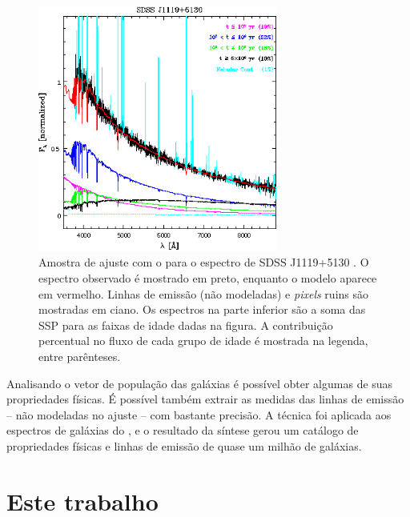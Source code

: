 \begin{figure}
	\includegraphics[width=0.7\textwidth]{figuras/starlight-fit.eps}
	\caption[Amostra de ajuste de espectro com o \starlight.]
	{Amostra de ajuste com o \starlight para o espectro de SDSS
	J1119+5130 \citep[figura 2]{CidFernandes2006}. O espectro observado é mostrado
	em preto, enquanto o modelo aparece em vermelho. Linhas de emissão (não
	modeladas) e {\em pixels} ruins são mostradas em ciano. Os espectros na parte
	inferior são a soma das SSP para as faixas de idade dadas na figura. A
	contribuição percentual no fluxo de cada grupo de idade é mostrada na legenda,
	entre parênteses.}
	\label{fig:StarlightSpectrumSample}
\end{figure}

Analisando o vetor de população das galáxias é possível obter algumas de suas
propriedades físicas. É possível também extrair as medidas das linhas de emissão
-- não modeladas no ajuste -- com bastante precisão. A técnica foi aplicada aos
espectros de galáxias do \SDSS, e o resultado da síntese gerou um catálogo de
propriedades físicas e linhas de emissão de quase um milhão de galáxias.



\section{Este trabalho}
\label{sec:Intro:EsteTrab}

